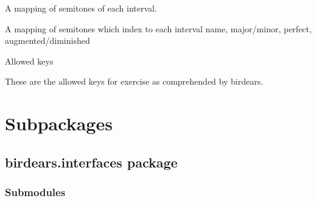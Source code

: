 \documentclass[letterpaper,10pt,english]{sphinxmanual}
\begin{document}

\begin{fulllineitems}
\label{\detokenize{birdears:birdears.INTERVAL_INDEX}}
 \textendash{} A mapping of semitones of each interval.

A mapping of semitones which index to each interval name, major/minor,
perfect, augmented/diminished

\end{fulllineitems}


\begin{fulllineitems}
\label{\detokenize{birdears:birdears.KEYS}}
 \textendash{} Allowed keys

These are the allowed keys for exercise as comprehended by birdears.

\end{fulllineitems}



\section{Subpackages}
\label{\detokenize{birdears:subpackages}}

\subsection{birdears.interfaces package}
\label{\detokenize{birdears.interfaces::doc}}\label{\detokenize{birdears.interfaces:birdears-interfaces-package}}\label{\detokenize{birdears.interfaces:module-birdears.interfaces}}

\subsubsection{Submodules}
\label{\detokenize{birdears.interfaces:submodules}}
\end{document}
